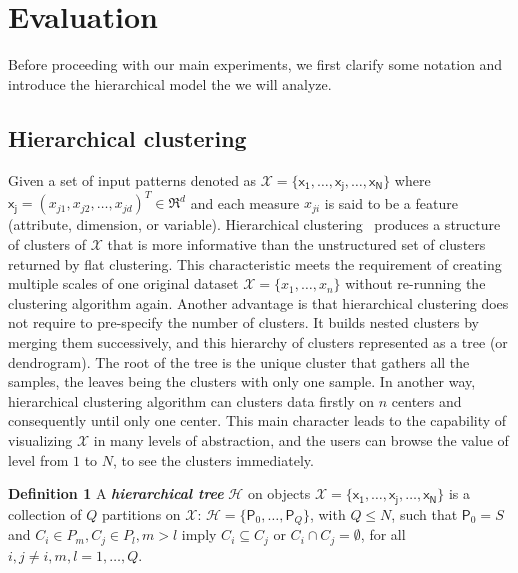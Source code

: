 \section{Evaluation}
\label{sec:evaluation}
Before proceeding with our main experiments, we first clarify some notation and introduce the hierarchical model the we will analyze. 
\subsection{Hierarchical clustering}
\label{subsec:hierarchical}
Given a set of input patterns denoted as $\mathcal{X} = \{\mathsf{x_1}, \ldots, \mathsf{x_j}, \ldots, \mathsf{x_N}\}$ where $\mathsf{x_j} = (x_{j1},x_{j2}, \ldots,x_{jd})^T \in \mathfrak{R}^d$ and each measure $x_{ji}$ is said to be a feature (attribute, dimension, or variable). Hierarchical clustering~\cite{johnson1967hierarchical} produces a structure of clusters of $\mathcal{X}$ that is more informative than the unstructured set of clusters returned by flat clustering. 
This characteristic meets the requirement of creating multiple scales of one original dataset $\mathcal{X}=\{x_1, \ldots, x_n\}$ 
without re-running the clustering algorithm again. Another advantage is that hierarchical clustering does not require to pre-specify the number of clusters. It builds nested clusters by merging them successively, and this hierarchy of clusters represented as a tree (or dendrogram). The root of the tree is the unique cluster that gathers all the samples, the leaves being the clusters with only one sample. In another way, hierarchical clustering algorithm %
can clusters data firstly on $n$ centers and consequently until only one center. This main character leads to the capability of visualizing $\mathcal{X}$ in many levels of abstraction, and the users can browse the value of level from $1$ to $N$, to see the clusters immediately.

\textbf{Definition 1} A \textit{\textbf{hierarchical tree}} $\mathcal{H}$ on objects $\mathcal{X}=\{\mathsf{x_1}, \ldots, \mathsf{x_j}, \ldots, \mathsf{x_N}\}$ is a collection of $Q$ partitions on $\mathcal{X}$: $\mathcal{H}=\{\mathsf{P}_0,\ldots,\mathsf{P}_Q\}$, with $Q \leq N$, such that $\mathsf{P}_0=S$ and $C_{i} \in P_{m}, C_{j} \in P_{l}, m > l$ imply $C_{i} \subseteq C_{j}$ or $C_{i} \cap C_{j} = \emptyset$, for all $i,j \neq i, m, l = 1, \ldots, Q$.

